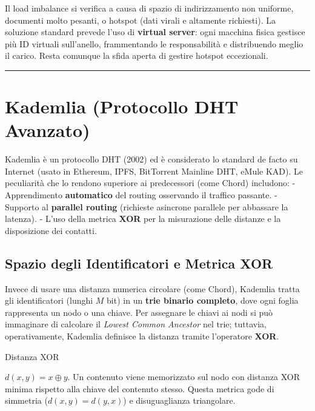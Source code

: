 \documentclass[
  italian,
  openany]{book}
\begin{document}
Il load imbalance si verifica a causa di spazio di indirizzamento non
uniforme, documenti molto pesanti, o hotspot (dati virali e altamente
richiesti). La soluzione standard prevede l'uso di \textbf{virtual
server}: ogni macchina fisica gestisce più ID virtuali sull'anello,
frammentando le responsabilità e distribuendo meglio il carico. Resta
comunque la sfida aperta di gestire hotspot eccezionali.

\begin{center}\rule{0.5\linewidth}{0.5pt}\end{center}

\section{Kademlia (Protocollo DHT
Avanzato)}\label{kademlia-protocollo-dht-avanzato}

Kademlia è un protocollo DHT (2002) ed è considerato lo standard de
facto su Internet (usato in Ethereum, IPFS, BitTorrent Mainline DHT,
eMule KAD). Le peculiarità che lo rendono superiore ai predecessori
(come Chord) includono: - Apprendimento \textbf{automatico} del routing
osservando il traffico passante. - Supporto al \textbf{parallel routing}
(richieste asincrone parallele per abbassare la latenza). - L'uso della
metrica \textbf{XOR} per la misurazione delle distanze e la disposizione
dei contatti.

\subsection{Spazio degli Identificatori e Metrica
XOR}\label{spazio-degli-identificatori-e-metrica-xor}

Invece di usare una distanza numerica circolare (come Chord), Kademlia
tratta gli identificatori (lunghi \(M\) bit) in un \textbf{trie binario
completo}, dove ogni foglia rappresenta un nodo o una chiave. Per
assegnare le chiavi ai nodi si può immaginare di calcolare il
\emph{Lowest Common Ancestor} nel trie; tuttavia, operativamente,
Kademlia definisce la distanza tramite l'operatore \textbf{XOR}.

\begin{calloutdefinition}{Distanza XOR}

\(d(x, y) = x \oplus y\). Un contenuto viene memorizzato sul nodo con
distanza XOR minima rispetto alla chiave del contenuto stesso. Questa
metrica gode di simmetria (\(d(x,y)=d(y,x)\)) e disuguaglianza
triangolare.

\end{calloutdefinition}
\end{document}
